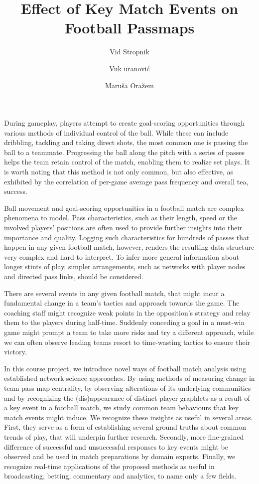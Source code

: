 \documentclass[9pt,twocolumn,twoside]{pnas-report}
\title{Effect of Key Match Events on Football Passmaps}
\author[a,1]{Vid Stropnik}
\author[a]{Vuk \DJ uranović}
\author[a]{Maruša Oražem}
\affil[a]{University of Ljubljana, Faculty of Computer and Information Science, Ve\v{c}na pot 113, SI-1000 Ljubljana, Slovenia}
\begin{document}
\maketitle
\thispagestyle{firststyle}



 During gameplay, players attempt to create goal-scoring opportunities through various methods of individual control of the ball. While these can include dribbling, tackling and taking direct shots, the most common one is passing the ball to a teammate. Progressing the ball along the pitch with a series of passes helps the team retain control of the match, enabling them to realize set plays. It is worth noting that this method is not only common, but also effective, as exhibited by the correlation of per-game average pass frequency and overall tea, success. \cite{plpasses}

Ball movement and goal-scoring opportunities in a football match are complex phenomena to model. Pass characteristics, such as their length, speed or the involved players' positions are often used to provide further insights into their importance and quality. Logging such characteristics for hundreds of passes that happen in any given football match, however, renders the resulting data structure very complex and hard to interpret. To infer more general information about longer stints of play, simpler arrangements, such as networks with player nodes and directed pass links, should be considered.

There are several events in any given football match, that might incur a fundamental change in a team's tactics and approach towards the game. The coaching staff might recognize weak points in the opposition's strategy and relay them to the players during half-time. Suddenly conceding a goal in a must-win game might prompt a team to take more risks and try a different approach, while we can often observe leading teams resort to time-wasting tactics to ensure their victory. 

In this course project, we introduce novel ways of football match analysis using established network science approaches. By using methods of measuring change in team pass map centrality, by observing alterations of its underlying communities and by recognizing the (dis)appearance of distinct player graphlets as a result of a key event in a football match, we study common team behaviours that key match events might induce. We recognize these insights as useful in several areas. First, they serve as a form of establishing several ground truths about common trends of play, that will underpin further research. Secondly, more fine-grained difference of successful and unsuccessful responses to key events might be observed and be used in match preparations by domain experts. Finally, we recognize real-time applications of the proposed methods as useful in broadcasting, betting, commentary and analytics, to name only a few fields.
\end{document}
